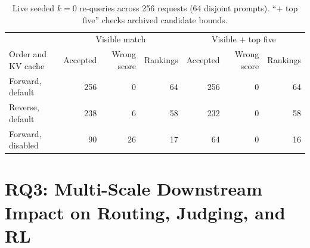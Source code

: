 \documentclass[11pt,letterpaper]{article}
\begin{document}
\begin{table}[t]
\centering
\caption{Live seeded $k=0$ re-queries across 256 requests (64 disjoint prompts). ``+ top five'' checks archived candidate bounds.}
\label{tab:repeat}
\footnotesize
\begin{tabular}{@{}lrrrrrr@{}}\toprule
& \multicolumn{3}{c}{Visible match} & \multicolumn{3}{c}{Visible + top five}\\
Order and KV cache & Accepted & Wrong score & Rankings & Accepted & Wrong score & Rankings\\\midrule
Forward, default & 256 & 0 & 64 & 256 & 0 & 64\\
Reverse, default & 238 & 6 & 58 & 232 & 0 & 58\\
Forward, disabled & 90 & 26 & 17 & 64 & 0 & 16\\\bottomrule
\end{tabular}
\end{table}

\section{RQ3: Multi-Scale Downstream Impact on Routing, Judging, and RL}
\label{sec:rq3}
\end{document}
